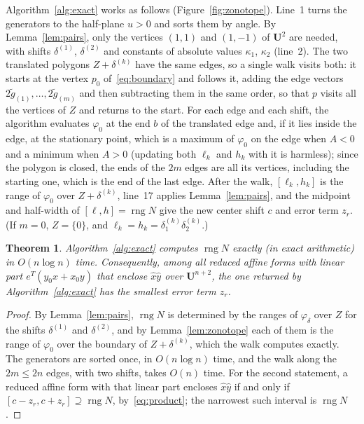 \documentclass[11pt]{article}
\newtheorem{theorem}{Theorem}
\theoremstyle{definition}
\newcommand{\U}{\mathbf{U}}
\newcommand{\rng}{\operatorname{rng}}
\begin{document}
Algorithm~\ref{alg:exact} works as follows (Figure~\ref{fig:zonotope}). Line~1 turns the generators to the half-plane $u>0$ and sorts them by angle. By Lemma~\ref{lem:pairs}, only the vertices $(1,1)$ and $(1,-1)$ of $\U^2$ are needed, with shifts $\delta^{(1)}$, $\delta^{(2)}$ and constants of absolute values $\kappa_1$, $\kappa_2$ (line~2). The two translated polygons $Z+\delta^{(k)}$ have the same edges, so a single walk visits both: it starts at the vertex $p_0$ of~\eqref{eq:boundary} and follows it, adding the edge vectors $2\tilde g_{(1)},\dots,2\tilde g_{(m)}$ and then subtracting them in the same order, so that $p$ visits all the vertices of $Z$ and returns to the start. For each edge and each shift, the algorithm evaluates $\varphi_0$ at the end $b$ of the translated edge and, if it lies inside the edge, at the stationary point, which is a maximum of $\varphi_0$ on the edge when $A<0$ and a minimum when $A>0$ (updating both $\ell_k$ and $h_k$ with it is harmless); since the polygon is closed, the ends of the $2m$ edges are all its vertices, including the starting one, which is the end of the last edge. After the walk, $[\ell_k,h_k]$ is the range of $\varphi_0$ over $Z+\delta^{(k)}$, line~17 applies Lemma~\ref{lem:pairs}, and the midpoint and half-width of $[\ell,h]=\rng N$ give the new center shift $c$ and error term $z_r$. (If $m=0$, $Z=\{0\}$, and $\ell_k=h_k=\delta^{(k)}_1\delta^{(k)}_2$.)

\begin{theorem}
\label{thm:exact}
Algorithm~\ref{alg:exact} computes $\rng N$ exactly (in exact arithmetic) in $O(n\log n)$ time. Consequently, among all reduced affine forms with linear part $e^T(y_0x+x_0y)$ that enclose $\hat x\hat y$ over $\U^{n+2}$, the one returned by Algorithm~\ref{alg:exact} has the smallest error term $z_r$.
\end{theorem}
\begin{proof}
By Lemma~\ref{lem:pairs}, $\rng N$ is determined by the ranges of $\varphi_\delta$ over $Z$ for the shifts $\delta^{(1)}$ and $\delta^{(2)}$, and by Lemma~\ref{lem:zonotope} each of them is the range of $\varphi_0$ over the boundary of $Z+\delta^{(k)}$, which the walk computes exactly. The generators are sorted once, in $O(n\log n)$ time, and the walk along the $2m\le 2n$ edges, with two shifts, takes $O(n)$ time. For the second statement, a reduced affine form with that linear part encloses $\hat x\hat y$ if and only if $[c-z_r,c+z_r]\supseteq\rng N$, by~\eqref{eq:product}; the narrowest such interval is $\rng N$.
\end{proof}
\end{document}
